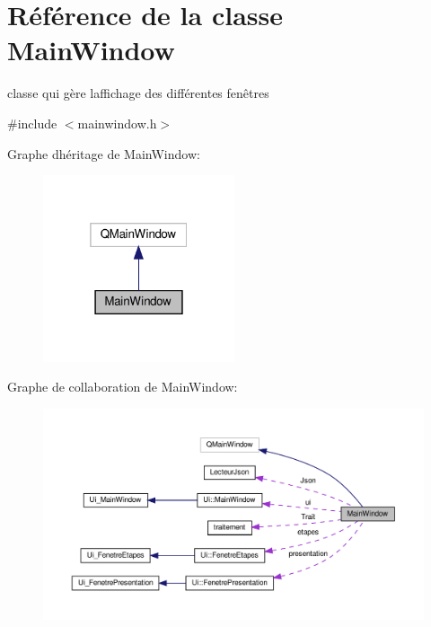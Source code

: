 \hypertarget{class_main_window}{}\section{Référence de la classe Main\+Window}
\label{class_main_window}


classe qui gère l\textquotesingle{}affichage des différentes fenêtres  




{\ttfamily \#include $<$mainwindow.\+h$>$}



Graphe d\textquotesingle{}héritage de Main\+Window\+:
\nopagebreak
\begin{figure}[H]
\begin{center}
\leavevmode
\includegraphics[width=160pt]{class_main_window__inherit__graph}
\end{center}
\end{figure}


Graphe de collaboration de Main\+Window\+:
\nopagebreak
\begin{figure}[H]
\begin{center}
\leavevmode
\includegraphics[width=350pt]{class_main_window__coll__graph}
\end{center}
\end{figure}
